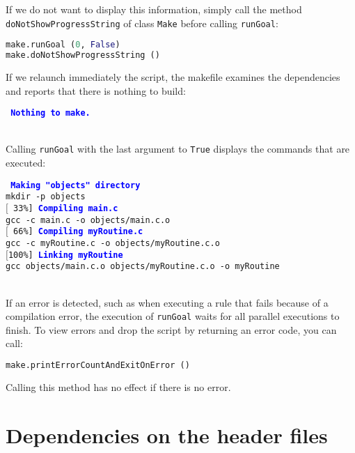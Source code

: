 \documentclass[a4paper,11pt]{extarticle}
\begin{document}
If we do not want to display this information, simply call the method \texttt{doNotShowProgressString}  of class \texttt{Make} before calling \texttt{runGoal}:

\begin{lstlisting}[language=py]
make.runGoal (0, False)
make.doNotShowProgressString ()
\end{lstlisting}


If we relaunch immediately the script, the makefile examines the dependencies and reports that there is nothing to build:

\begin{mdframed}[hidealllines=true,backgroundcolor=lightgray!20]
\tt\footnotesize
\textcolor{blue}{\bf Nothing to make.}
\end{mdframed}



~\\Calling \texttt{runGoal} with the last argument to \texttt{True} displays the commands that are executed:

\begin{mdframed}[hidealllines=true,backgroundcolor=lightgray!20]
\tt\footnotesize
\textcolor{blue}{\bf Making "objects" directory}\\
mkdir -p objects\\
$[$~33\%]~\textcolor{blue}{\bf Compiling main.c}\\
gcc -c main.c -o objects/main.c.o\\
$[$~66\%]~\textcolor{blue}{\bf Compiling myRoutine.c}\\
gcc -c myRoutine.c -o objects/myRoutine.c.o\\
$[$100\%]~\textcolor{blue}{\bf Linking myRoutine}\\
gcc objects/main.c.o objects/myRoutine.c.o -o myRoutine
\end{mdframed}

~\\If an error is detected, such as when executing a rule that fails because of a compilation error, the execution of \texttt{runGoal}  waits for all parallel executions to finish. To view errors and drop the script by returning an error code, you can call:
\begin{lstlisting}[language=py]
make.printErrorCountAndExitOnError ()
\end{lstlisting}
Calling this method has no effect if there is no error.

\section{Dependencies on the header files}
\end{document}
